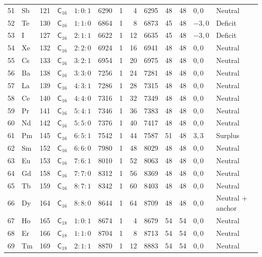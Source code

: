 {\begin{longtable}{@{}rllccrrrrrrll@{}}
51 & Sb & 121 & $\mathsf{C}_{16}$ & $1:0:1$ & 6290 & 1 & 4 & 6295 & 48 & 48 & $0,0$ & Neutral\\
52 & Te & 130 & $\mathsf{C}_{16}$ & $1:1:0$ & 6864 & 1 & 8 & 6873 & 45 & 48 & $-3,0$ & Deficit\\
53 & I & 127 & $\mathsf{C}_{16}$ & $2:1:1$ & 6622 & 1 & 12 & 6635 & 45 & 48 & $-3,0$ & Deficit\\
54 & Xe & 132 & $\mathsf{C}_{16}$ & $2:2:0$ & 6924 & 1 & 16 & 6941 & 48 & 48 & $0,0$ & Neutral\\
55 & Cs & 133 & $\mathsf{C}_{16}$ & $3:2:1$ & 6954 & 1 & 20 & 6975 & 48 & 48 & $0,0$ & Neutral\\
56 & Ba & 138 & $\mathsf{C}_{16}$ & $3:3:0$ & 7256 & 1 & 24 & 7281 & 48 & 48 & $0,0$ & Neutral\\
57 & La & 139 & $\mathsf{C}_{16}$ & $4:3:1$ & 7286 & 1 & 28 & 7315 & 48 & 48 & $0,0$ & Neutral\\
58 & Ce & 140 & $\mathsf{C}_{16}$ & $4:4:0$ & 7316 & 1 & 32 & 7349 & 48 & 48 & $0,0$ & Neutral\\
59 & Pr & 141 & $\mathsf{C}_{16}$ & $5:4:1$ & 7346 & 1 & 36 & 7383 & 48 & 48 & $0,0$ & Neutral\\
60 & Nd & 142 & $\mathsf{C}_{16}$ & $5:5:0$ & 7376 & 1 & 40 & 7417 & 48 & 48 & $0,0$ & Neutral\\
61 & Pm & 145 & $\mathsf{C}_{16}$ & $6:5:1$ & 7542 & 1 & 44 & 7587 & 51 & 48 & $3,3$ & Surplus\\
62 & Sm & 152 & $\mathsf{C}_{16}$ & $6:6:0$ & 7980 & 1 & 48 & 8029 & 48 & 48 & $0,0$ & Neutral\\
63 & Eu & 153 & $\mathsf{C}_{16}$ & $7:6:1$ & 8010 & 1 & 52 & 8063 & 48 & 48 & $0,0$ & Neutral\\
64 & Gd & 158 & $\mathsf{C}_{16}$ & $7:7:0$ & 8312 & 1 & 56 & 8369 & 48 & 48 & $0,0$ & Neutral\\
65 & Tb & 159 & $\mathsf{C}_{16}$ & $8:7:1$ & 8342 & 1 & 60 & 8403 & 48 & 48 & $0,0$ & Neutral\\
66 & Dy & 164 & $\mathsf{C}_{16}$ & $8:8:0$ & 8644 & 1 & 64 & 8709 & 48 & 48 & $0,0$ & Neutral + anchor\\
67 & Ho & 165 & $\mathsf{C}_{18}$ & $1:0:1$ & 8674 & 1 & 4 & 8679 & 54 & 54 & $0,0$ & Neutral\\
68 & Er & 166 & $\mathsf{C}_{18}$ & $1:1:0$ & 8704 & 1 & 8 & 8713 & 54 & 54 & $0,0$ & Neutral\\
69 & Tm & 169 & $\mathsf{C}_{18}$ & $2:1:1$ & 8870 & 1 & 12 & 8883 & 54 & 54 & $0,0$ & Neutral\\

\end{longtable}}
